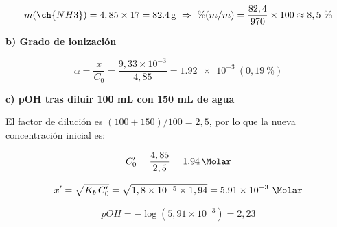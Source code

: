 \begin{exerciseEVAU}
\begin{solu}
        \begin{equation*}
            m(\ch{NH3}) = 4,85 \times 17 = \SI{82.4}{\gram} \ \Rightarrow \ \%(m/m) = \dfrac{82,4}{970}\times100 \approx 8,5\ \%
        \end{equation*}

        \textbf{b) Grado de ionización}

        \begin{equation*}
            \alpha = \dfrac{x}{C_0} = \dfrac{9,33\times10^{-3}}{4,85} = \num{1.92e-3} \ (0,19\ \%)
        \end{equation*}

        \textbf{c) pOH tras diluir 100 mL con 150 mL de agua}

        El factor de dilución es \((100+150)/100 = 2,5\), por lo que la nueva concentración inicial es:

        \begin{equation*}
            C_0' = \dfrac{4,85}{2,5} = \SI{1.94}{\Molar}
        \end{equation*}

        \begin{equation*}
            x' = \sqrt{K_b\, C_0'} = \sqrt{1,8\times10^{-5}\times1,94} = \num{5.91e-3} \ \si{\Molar}
        \end{equation*}

        \begin{equation*}
            pOH = -\log(5,91\times10^{-3}) = 2,23
        \end{equation*}

    \end{solu}
\end{exerciseEVAU}

